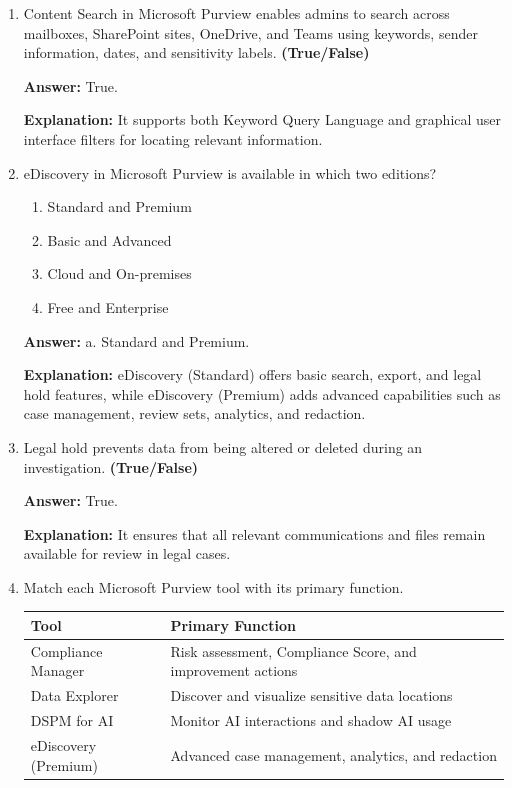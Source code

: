 \documentclass[10pt]{article}
\begin{document}
\begin{enumerate}[leftmargin=*]
\textbf{Answer:} True.

\textbf{Explanation:} These tools provide centralized visibility into how sensitive data is accessed, processed, and exposed across AI-driven workflows.

\item Content Search in Microsoft Purview enables admins to search across mailboxes, SharePoint sites, OneDrive, and Teams using keywords, sender information, dates, and sensitivity labels. \textbf{(True/False)}

\textbf{Answer:} True.

\textbf{Explanation:} It supports both Keyword Query Language and graphical user interface filters for locating relevant information.

\item eDiscovery in Microsoft Purview is available in which two editions?
\begin{enumerate}[label=\alph*., leftmargin=1.5em]
\item Standard and Premium
\item Basic and Advanced
\item Cloud and On-premises
\item Free and Enterprise
\end{enumerate}
\textbf{Answer:} a. Standard and Premium.

\textbf{Explanation:} eDiscovery (Standard) offers basic search, export, and legal hold features, while eDiscovery (Premium) adds advanced capabilities such as case management, review sets, analytics, and redaction.

\item Legal hold prevents data from being altered or deleted during an investigation. \textbf{(True/False)}

\textbf{Answer:} True.

\textbf{Explanation:} It ensures that all relevant communications and files remain available for review in legal cases.

\item Match each Microsoft Purview tool with its primary function.

\begin{center}
\begin{tabular}{>{\raggedright\arraybackslash}p{} >{\raggedright\arraybackslash}p{}}
\toprule
\textbf{Tool} & \textbf{Primary Function} \\
\midrule
Compliance Manager & Risk assessment, Compliance Score, and improvement actions \\
Data Explorer & Discover and visualize sensitive data locations \\
DSPM for AI & Monitor AI interactions and shadow AI usage \\
eDiscovery (Premium) & Advanced case management, analytics, and redaction \\
\bottomrule
\end{tabular}
\end{center}


\end{enumerate}
\end{document}
